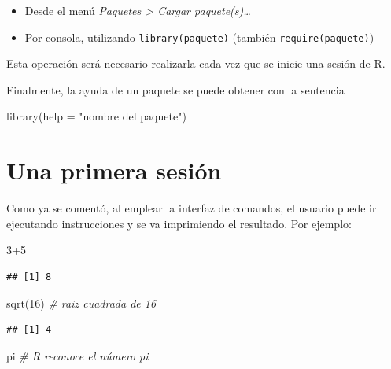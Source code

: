 \documentclass[
]{book}
\newenvironment{Shaded}{\begin{snugshade}}{\end{snugshade}}
\newcommand{\AttributeTok}[1]{\textcolor[rgb]{0.77,0.63,0.00}{#1}}
\newcommand{\CommentTok}[1]{\textcolor[rgb]{0.56,0.35,0.01}{\textit{#1}}}
\newcommand{\DecValTok}[1]{\textcolor[rgb]{0.00,0.00,0.81}{#1}}
\newcommand{\FunctionTok}[1]{\textcolor[rgb]{0.00,0.00,0.00}{#1}}
\newcommand{\NormalTok}[1]{#1}
\newcommand{\SpecialCharTok}[1]{\textcolor[rgb]{0.00,0.00,0.00}{#1}}
\newcommand{\StringTok}[1]{\textcolor[rgb]{0.31,0.60,0.02}{#1}}
\theoremstyle{break}
\theoremstyle{nonumberplain}
\begin{document}
\begin{itemize}
\item
  Desde el menú \emph{Paquetes \textgreater{} Cargar paquete(s)\ldots{}}
\item
  Por consola, utilizando \texttt{library(paquete)} (también \texttt{require(paquete)})
\end{itemize}

Esta operación será necesario realizarla cada vez que se inicie una
sesión de R.

Finalmente, la ayuda de un paquete se puede obtener con la sentencia

\begin{Shaded}
\begin{Highlighting}[]
\FunctionTok{library}\NormalTok{(}\AttributeTok{help =} \StringTok{"nombre del paquete"}\NormalTok{) }
\end{Highlighting}
\end{Shaded}

\hypertarget{una-primera-sesiuxf3n}{%
\section{Una primera sesión}\label{una-primera-sesiuxf3n}}

Como ya se comentó, al emplear la interfaz de comandos, el usuario puede ir ejecutando instrucciones y se va imprimiendo el resultado.
Por ejemplo:

\begin{Shaded}
\begin{Highlighting}[]
\DecValTok{3}\SpecialCharTok{+}\DecValTok{5}
\end{Highlighting}
\end{Shaded}

\begin{verbatim}
## [1] 8
\end{verbatim}

\begin{Shaded}
\begin{Highlighting}[]
\FunctionTok{sqrt}\NormalTok{(}\DecValTok{16}\NormalTok{) }\CommentTok{\# raiz cuadrada de 16}
\end{Highlighting}
\end{Shaded}

\begin{verbatim}
## [1] 4
\end{verbatim}

\begin{Shaded}
\begin{Highlighting}[]
\NormalTok{pi }\CommentTok{\# R reconoce el número pi}
\end{Highlighting}
\end{Shaded}
\end{document}
